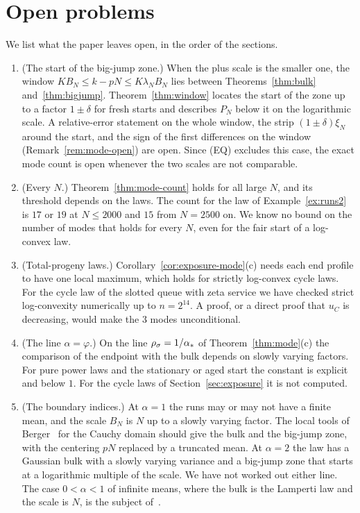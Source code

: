 \section{Open problems}\label{sec:open}

We list what the paper leaves open, in the order of the sections.
\begin{enumerate}[(1)]
\item (The start of the big-jump zone.) When the plus scale is the smaller one, the window
$KB_N\le k-pN\le K\lambda_NB_N$ lies between Theorems~\ref{thm:bulk} and~\ref{thm:bigjump}.
Theorem~\ref{thm:window} locates the start of the zone up to a factor $1\pm\delta$ for fresh
starts and describes $P_N$ below it on the logarithmic scale. A relative-error statement on
the whole window, the strip $(1\pm\delta)\xi_N$ around the start, and the sign of the first
differences on the window (Remark~\ref{rem:mode-open}) are open. Since (EQ) excludes this
case, the exact mode count is open whenever the two scales are not comparable.
\item (Every $N$.) Theorem~\ref{thm:mode-count} holds for all large $N$, and its threshold
depends on the laws. The count for the law of Example~\ref{ex:runs2} is $17$ or $19$ at
$N\le2000$ and $15$ from $N=2500$ on. We know no bound on the number of modes that holds for
every $N$, even for the fair start of a log-convex law.
\item (Total-progeny laws.) Corollary~\ref{cor:exposure-mode}(c) needs each end profile to
have one local maximum, which holds for strictly log-convex cycle laws. For the cycle law of
the slotted queue with zeta service we have checked strict log-convexity numerically up to
$n=2^{14}$. A proof, or a direct proof that $u_C$ is decreasing, would make the 3 modes
unconditional.
\item (The line $\alpha=\varphi$.) On the line $\rho_\sigma=1/\alpha_*$ of
Theorem~\ref{thm:mode}(c) the comparison of the endpoint with the bulk depends on slowly
varying factors. For pure power laws and the stationary or aged start the constant is
explicit and below $1$. For the cycle laws of Section~\ref{sec:exposure} it is not computed.
\item (The boundary indices.) At $\alpha=1$ the runs may or may not have a finite mean, and the
scale $B_N$ is $N$ up to a slowly varying factor. The local tools of Berger~\cite{berger2019ptrf}
for the Cauchy domain should give the bulk and the big-jump zone, with the centering
$pN$ replaced by a truncated mean. At $\alpha=2$ the law has a Gaussian bulk with a slowly
varying variance and a big-jump zone that starts at a logarithmic multiple of the scale. We
have not worked out either line. The case $0<\alpha<1$ of infinite means, where the bulk is
the Lamperti law and the scale is $N$, is the subject of~\cite{paperG}.
\end{enumerate}
